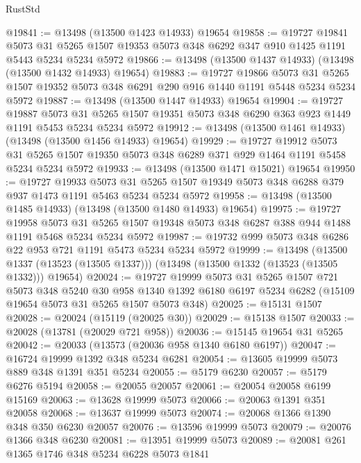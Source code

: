 \begin{lexlean}{RustStd}
\begin{coremodule}
@19841 := @13498 (@13500 @1423 @14933) @19654
@19858 := @19727
    @19841
    @5073
    @31
    @5265
    @1507
    @19353
    @5073
    @348
    @6292
    @347
    @910
    @1425
    @1191
    @5443
    @5234
    @5234
    @5972
@19866 := @13498 (@13500 @1437 @14933) (@13498 (@13500 @1432 @14933) @19654)
@19883 := @19727
    @19866
    @5073
    @31
    @5265
    @1507
    @19352
    @5073
    @348
    @6291
    @290
    @916
    @1440
    @1191
    @5448
    @5234
    @5234
    @5972
@19887 := @13498 (@13500 @1447 @14933) @19654
@19904 := @19727
    @19887
    @5073
    @31
    @5265
    @1507
    @19351
    @5073
    @348
    @6290
    @363
    @923
    @1449
    @1191
    @5453
    @5234
    @5234
    @5972
@19912 := @13498 (@13500 @1461 @14933) (@13498 (@13500 @1456 @14933) @19654)
@19929 := @19727
    @19912
    @5073
    @31
    @5265
    @1507
    @19350
    @5073
    @348
    @6289
    @371
    @929
    @1464
    @1191
    @5458
    @5234
    @5234
    @5972
@19933 := @13498 (@13500 @1471 @15021) @19654
@19950 := @19727
    @19933
    @5073
    @31
    @5265
    @1507
    @19349
    @5073
    @348
    @6288
    @379
    @937
    @1473
    @1191
    @5463
    @5234
    @5234
    @5972
@19958 := @13498 (@13500 @1485 @14933) (@13498 (@13500 @1480 @14933) @19654)
@19975 := @19727
    @19958
    @5073
    @31
    @5265
    @1507
    @19348
    @5073
    @348
    @6287
    @388
    @944
    @1488
    @1191
    @5468
    @5234
    @5234
    @5972
@19987 := @19732 @999 @5073 @348 @6286 @22 @953 @721 @1191 @5473 @5234 @5234 @5972
@19999 := @13498
    (@13500 @1337 (@13523 (@13505 @1337)))
    (@13498 (@13500 @1332 (@13523 (@13505 @1332))) @19654)
@20024 := @19727
    @19999
    @5073
    @31
    @5265
    @1507
    @721
    @5073
    @348
    @5240
    @30
    @958
    @1340
    @1392
    @6180
    @6197
    @5234
    @6282
    (@15109 @19654 @5073 @31 @5265 @1507 @5073 @348)
@20025 := @15131 @1507
@20028 := @20024 (@15119 (@20025 @30))
@20029 := @15138 @1507
@20033 := @20028 (@13781 (@20029 @721 @958))
@20036 := @15145 @19654 @31 @5265
@20042 := @20033 (@13573 (@20036 @958 @1340 @6180 @6197))
@20047 := @16724 @19999 @1392 @348 @5234 @6281
@20054 := @13605 @19999 @5073 @889 @348 @1391 @351 @5234
@20055 := @5179 @6230
@20057 := @5179 @6276 @5194
@20058 := @20055 @20057
@20061 := @20054 @20058 @6199 @15169
@20063 := @13628 @19999 @5073
@20066 := @20063 @1391 @351 @20058
@20068 := @13637 @19999 @5073
@20074 := @20068 @1366 @1390 @348 @350 @6230 @20057
@20076 := @13596 @19999 @5073
@20079 := @20076 @1366 @348 @6230
@20081 := @13951 @19999 @5073
@20089 := @20081 @261 @1365 @1746 @348 @5234 @6228 @5073 @1841

\end{coremodule}
\end{lexlean}
